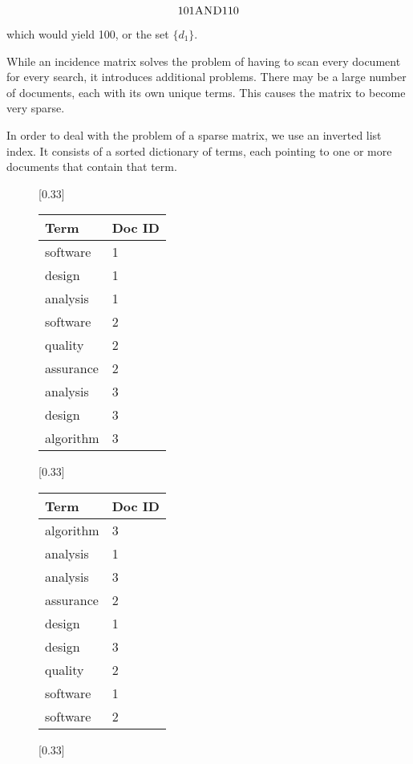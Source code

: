 \begin{ex}
		$$101 \textsc{AND} 110$$
		
		which would yield 100, or the set $\{d_1\}$.
		
		While an incidence matrix solves the problem of having to scan every document for every search, it introduces additional problems.  There may be a large number of documents, each with its own unique terms.  This causes the matrix to become very sparse.
		
		In order to deal with the problem of a sparse matrix, we use an inverted list index.  It consists of a sorted dictionary of terms, each pointing to one or more documents that contain that term.
		
		\begin{figure}[!ht]
			\centering
			
			[0.33\textwidth]{
				\centering
				\begin{tabular}{ll}
					\toprule
					Term & Doc ID \\
					\midrule
					software & 1 \\
					design & 1 \\
					analysis & 1 \\
					software & 2 \\
					quality & 2 \\
					assurance & 2 \\
					analysis & 3 \\
					design & 3 \\
					algorithm & 3 \\
					\bottomrule
				\end{tabular}
			}
			[0.33\textwidth]{
				\centering
				\begin{tabular}{ll}
					\toprule
					Term & Doc ID \\
					\midrule
					algorithm & 3 \\
					analysis & 1 \\
					analysis & 3 \\
					assurance & 2 \\
					design & 1 \\
					design & 3 \\
					quality & 2 \\
					software & 1 \\
					software & 2 \\
					\bottomrule
				\end{tabular}
			}
			[0.33\textwidth]{
}
\end{figure}
\end{ex}

